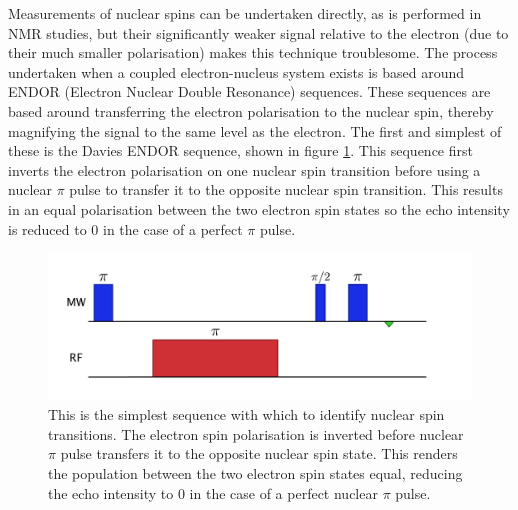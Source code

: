 Measurements of nuclear spins can be undertaken directly, as is performed in NMR studies, but their significantly weaker signal relative to the electron (due to their much smaller polarisation) makes this technique troublesome.
The process undertaken when a coupled electron-nucleus system exists is based around ENDOR (Electron Nuclear Double Resonance) sequences.
These sequences are based around transferring the electron polarisation to the nuclear spin, thereby magnifying the signal to the same level as the electron.
The first and simplest of these is the Davies ENDOR sequence, shown in figure \ref{fig:DaviesENDOR}.
This sequence first inverts the electron polarisation on one nuclear spin transition before using a nuclear $\pi$ pulse to transfer it to the opposite nuclear spin transition.
This results in an equal polarisation between the two electron spin states so the echo intensity is reduced to 0 in the case of a perfect $\pi$ pulse.



\begin{figure}
\centering
\includegraphics[width=\columnwidth]{Figures/daviesENDOR.pdf}
\caption[Davies ENDOR sequence]{This is the simplest sequence with which to identify nuclear spin transitions. The electron spin polarisation is inverted before nuclear $\pi$ pulse transfers it to the opposite nuclear spin state. This renders the population between the two electron spin states equal, reducing the echo intensity to 0 in the case of a perfect nuclear $\pi$ pulse.}
\label{fig:DaviesENDOR}
\end{figure}

